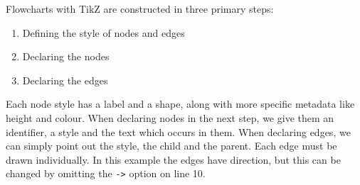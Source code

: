 Flowcharts with TikZ are constructed in three primary steps:

\begin{enumerate}
    \item Defining the style of nodes and edges
    \item Declaring the nodes
    \item Declaring the edges
\end{enumerate}

Each node style has a label and a shape, along with more specific metadata like height and colour. When declaring nodes in the next step, we give them an identifier, a style and the text which occurs in them. When declaring edges, we can simply point out the style, the child and the parent. Each edge must be drawn individually. In this example the edges have direction, but this can be changed by omitting the \texttt{->} option on line 10.

